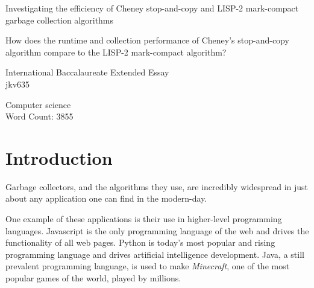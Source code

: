 \documentclass[index]{subfiles}
\begin{document}
\doublespacing{}
\begin{titlepage}
   \begin{center}
       \vspace*{1cm}

       {\huge{Investigating the efficiency of Cheney stop-and-copy and LISP-2 mark-compact garbage collection algorithms}}

       \vspace{1.5cm}

       How does the runtime and collection performance of Cheney's stop-and-copy algorithm compare to the LISP-2 mark-compact algorithm?
            
       \vspace{1.5cm}

       \vfill
            
       International Baccalaureate Extended Essay\\
       jkv635\\

       \vspace{0.8cm}
     
       Computer science\\
       \vspace{0.8cm}
       Word Count: 3855\\
            
   \end{center}
\end{titlepage}

\tableofcontents
\thispagestyle{empty}
\newpage
\setcounter{page}{1}

\section{Introduction}

Garbage collectors, and the algorithms they use, are incredibly widespread in just about any application one can find in the modern-day.

One example of these applications is their use in higher-level programming languages. Javascript is the only programming language of the web and drives the functionality of all web pages. Python is today's most popular and rising programming language and drives artificial intelligence development. Java, a still prevalent programming language, is used to make \textit{Minecraft}, one of the most popular games of the world, played by millions.
\end{document}

